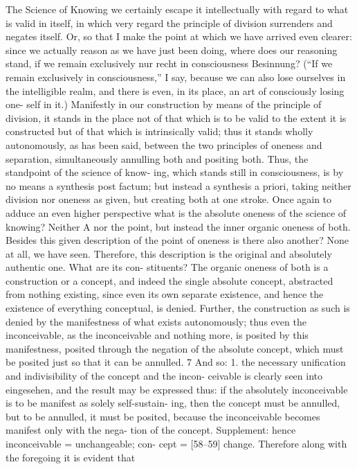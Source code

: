 The Science of Knowing
we certainly escape it intellectually with regard to what is valid in itself, in
which very regard the principle of division surrenders and negates itself.
Or, so that I make the point at which we have arrived even clearer: since
we actually reason as we have just been doing, where does our reasoning stand,
if we remain exclusively {nur recht} in consciousness {Besinnung}? (“If we remain
exclusively in consciousness,” I say, because we can also lose ourselves in the
intelligible realm, and there is even, in its place, an art of consciously losing one-
self in it.) Manifestly in our construction by means of the principle of division,
it stands in the place not of that which is to be valid to the extent it is constructed
but of that which is intrinsically valid; thus it stands wholly autonomously, as has
been said, between the two principles of oneness and separation, simultaneously
annulling both and positing both. Thus, the standpoint of the science of know-
ing, which stands still in consciousness, is by no means a synthesis post factum;
but instead a synthesis a priori, taking neither division nor oneness as given, but
creating both at one stroke. Once again to adduce an even higher perspective
what is the absolute oneness of the science of knowing? Neither A nor the point,
but instead the inner organic oneness of both. Besides this given description of
the point of oneness is there also another? None at all, we have seen. Therefore,
this description is the original and absolutely authentic one. What are its con-
stituents? The organic oneness of both is a construction or a concept, and indeed
the single absolute concept, abstracted from nothing existing, since even its own
separate existence, and hence the existence of everything conceptual, is denied.
Further, the construction as such is denied by the manifestness of what exists
autonomously; thus even the inconceivable, as the inconceivable and nothing
more, is posited by this manifestness, posited through the negation of the
absolute concept, which must be posited just so that it can be annulled. 7
And so:
1. the necessary unification and indivisibility of the concept and the incon-
ceivable is clearly seen into {eingesehen}, and the result may be expressed
thus: if the absolutely inconceivable is to be manifest as solely self-sustain-
ing, then the concept must be annulled, but to be annulled, it must be
posited, because the inconceivable becomes manifest only with the nega-
tion of the concept. Supplement: hence inconceivable = unchangeable; con-
cept = [58–59] change. Therefore along with the foregoing it is evident that
